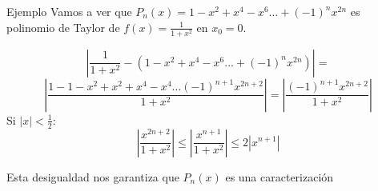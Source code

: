 \begin{frame}{Ejemplo}
  Vamos a ver que $P_n(x)= 1 - x^2 + x^4 - x^6 \dots + (-1)^nx^{2n}$ es polinomio de Taylor de
  $f(x)= \frac{1}{1+x^2}$ en $x_0=0$.

  $$|\frac{1}{1+x^2}-(1 - x^2 + x^4 - x^6 \dots + (-1)^nx^{2n})|
  =$$$$|\frac{1-1-x^2+x^2+x^4-x^4 \dots (-1)^{n+1}x^{2n+2}}{1+x^2}|=|\frac{(-1)^{n+1}x^{2n+2}}{1+x^2}|$$
  Si $|x|< \frac{1}{2}$:
  $$|\frac{x^{2n+2}}{1+x^2}|\leq |\frac{x^{n+1}}{1+x^2}| \leq 2|x^{n+1}| $$

  Esta desigualdad nos garantiza que $P_n(x)$
  es una caracterización
\end{frame}
